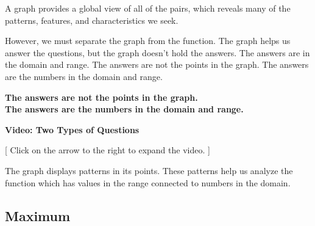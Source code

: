 \documentclass{ximera}
\begin{document}
A graph provides a global view of all of the pairs, which reveals many of the patterns, features, and characteristics we seek.   

However, we must separate the graph from the function.  The graph helps us answer the questions, but the graph doesn't hold the answers.  The answers are in the domain and range.  The answers are not the points in the graph.  The answers are the numbers in the domain and range.



\begin{center}

\textbf{\textcolor{blue!55!black}{The answers are not the points in the graph.}} \\

\textbf{\textcolor{blue!55!black}{The answers are the numbers in the domain and range.}}

\end{center}






\begin{explanation} \textbf{Video: Two Types of Questions}

[ Click on the arrow to the right to expand the video. ]
\begin{expandable} 

\begin{center}
\end{center}

\end{expandable}
\end{explanation}








The graph displays patterns in its points.  These patterns help us analyze the function which has values in the range connected to numbers in the domain.




\subsection*{Maximum}
\end{document}
